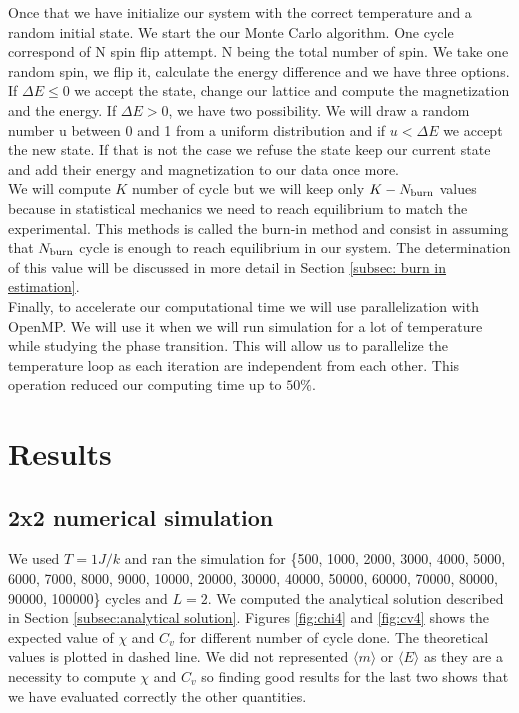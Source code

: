 \documentclass[english,notitlepage,reprint,nofootinbib]{revtex4-2}  %
\begin{document}
	Once that we have initialize our system with the correct temperature and a random initial
	state. We start the our Monte Carlo algorithm. One cycle correspond of N spin flip attempt. 
	N being the total number of spin. We take one random spin, we flip it, calculate the 
	energy difference and we have three options. If $\Delta E \le 0 $ we accept the state, 
	change our lattice and compute the magnetization and the energy. If $\Delta E > 0$, we have
	two possibility. We will draw a random number u between 0 and 1 from a uniform distribution
	and if $u < \Delta E$ we accept the new state. If that is not the case we refuse the state
	keep our current state and add their energy and magnetization to our data once more. \\
	
	We will compute $K$ number of cycle but we will keep only $K - N_{\rm burn}$ values 
	because in statistical mechanics we need to reach equilibrium to match the experimental. 
	This methods is called the burn-in method and consist in assuming that $N_{\rm burn}$ cycle
	is enough to reach equilibrium in our system. The determination of this value will be 
	discussed in more detail in Section \ref{subsec: burn in estimation}. \\
	
	Finally, to accelerate our computational time we will use parallelization with OpenMP. We 
	will use it when we will run simulation for a lot of temperature while studying the 
	phase transition. This will allow us to parallelize the temperature loop as each iteration
	are independent from each other. This operation reduced our computing time up to $50\%$. 

	\section{Results}\label{sec:results}
	\subsection{2x2 numerical simulation}\label{subsec: 2x2 numerical}
	We used $T=1 J/k$ and ran the simulation for \{500, 1000, 2000, 3000, 4000, 5000, 6000, 
	7000, 8000, 9000, 10000, 20000, 30000, 40000, 50000, 60000, 70000, 80000, 90000, 100000\}
	cycles and $L=2$. We computed the analytical solution described in Section \ref{subsec:analytical solution}. 
	Figures \ref{fig:chi4} and \ref{fig:cv4} shows the expected value of $\chi$ and $C_v$ for different number of cycle done. The theoretical values is plotted in dashed line. We did
	not represented $\langle m \rangle$ or $\langle E \rangle$ as they are a necessity to compute $\chi$ and $C_v$ so
	finding good results for the last two shows that we have evaluated correctly the other
	quantities. 
	
\end{document}
